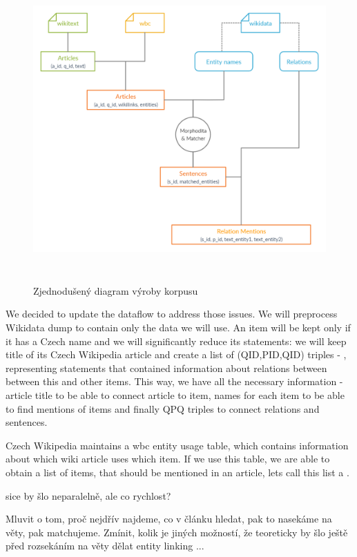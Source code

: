 \begin{figure}[p]\centering
\includegraphics[width=140mm, height=117mm]{./img/Corpus_diagram}
\caption{Zjednodušený diagram výroby korpusu}
\label{obr03:Nhust}
\end{figure}

We decided to update the dataflow to address those issues. We will preprocess Wikidata dump to contain only the data we will use. An item will be kept only if it has a Czech name and we will significantly reduce its statements: we will keep title of its Czech Wikipedia article and create a list of (QID,PID,QID) triples - , representing statements that contained information about relations between between this and other items. This way, we have all the necessary information - article title to be able to connect article to item, names for each item to be able to find mentions of items and finally QPQ triples to connect relations and sentences.


Czech Wikipedia maintains a wbc entity usage table, which contains information about which wiki article uses which item. If we use this table, we are able to obtain a list of items, that should be mentioned in an article, lets call this list a . 





sice by šlo neparalelně, ale co rychlost?

Mluvit o tom, proč nejdřív najdeme, co v článku hledat, pak to nasekáme na věty, pak matchujeme. Zmínit, kolik je jiných možností, že teoreticky by šlo ještě před rozsekáním na věty dělat entity linking ...

